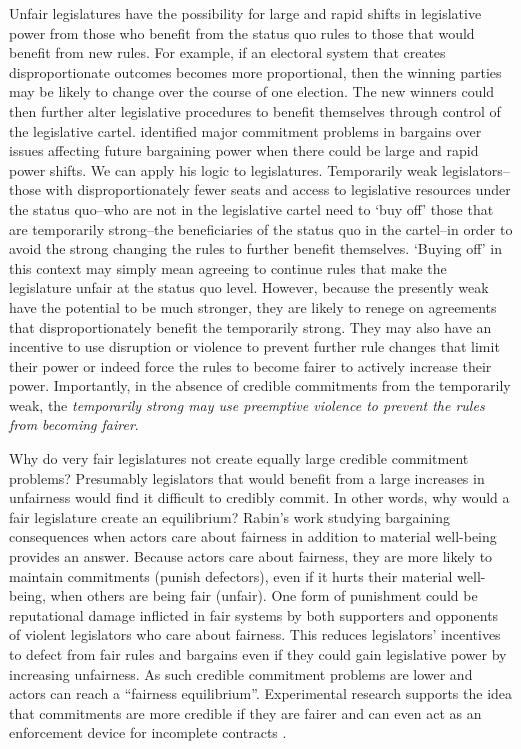 \documentclass[a4paper]{article}\usepackage[]{graphicx}\usepackage[]{color}
\begin{document}
Unfair legislatures have the possibility for large and rapid shifts in legislative power from those who benefit from the status quo rules to those that would benefit from new rules. For example, if an electoral system that creates disproportionate outcomes becomes more proportional, then the winning parties may be likely to change over the course of one election. The new winners could then further alter legislative procedures to benefit themselves through control of the legislative cartel. \cite{Powell2004,Powell2006} identified major commitment problems in bargains over issues affecting future bargaining power when there could be large and rapid power shifts. We can apply his logic to legislatures. Temporarily weak legislators--those with disproportionately fewer seats and access to legislative resources under the status quo--who are not in the legislative cartel need to `buy off' those that are temporarily strong--the beneficiaries of the status quo in the cartel--in order to avoid the strong changing the rules to further benefit themselves. `Buying off' in this context may simply mean agreeing to continue rules that make the legislature unfair at the status quo level. However, because the presently weak have the potential to be much stronger, they are likely to renege on agreements that disproportionately benefit the temporarily strong. They may also have an incentive to use disruption or violence to prevent further rule changes that limit their power or indeed force the rules to become fairer to actively increase their power. Importantly, in the absence of credible commitments from the temporarily weak, the \emph{temporarily strong may use preemptive violence to prevent the rules from becoming fairer}.

Why do very fair legislatures not create equally large credible commitment problems? Presumably legislators that would benefit from a large increases in unfairness would find it difficult to credibly commit. In other words, why would a fair legislature create an equilibrium? Rabin's \citeyearpar{Rabin1993} work studying bargaining consequences when actors care about fairness in addition to material well-being provides an answer. Because actors care about fairness, they are more likely to maintain commitments (punish defectors), even if it hurts their material well-being, when others are being fair (unfair). One form of punishment could be reputational damage inflicted in fair systems by both supporters and opponents of violent legislators who care about fairness. This reduces legislators' incentives to defect from fair rules and bargains even if they could gain legislative power by increasing unfairness. As such credible commitment problems are lower and actors can reach a ``fairness equilibrium''. Experimental research supports the idea that commitments are more credible if they are fairer \citep{Ellingsen2004} and can even act as an enforcement device for incomplete contracts \citep[see][for a review]{Fehr2008}.
\end{document}
